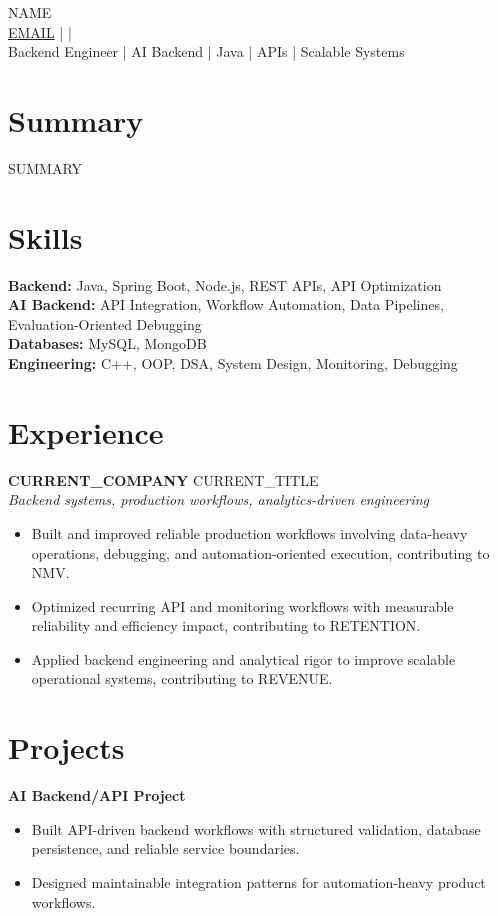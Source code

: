 \documentclass[10pt]{article}
\begin{document}
\begin{center}
{\Large {{NAME}}}\\
\href{mailto:{{EMAIL}}}{{{EMAIL}}} \quad |  \quad | \\
Backend Engineer | AI Backend | Java | APIs | Scalable Systems
\end{center}

\section*{Summary}
{{SUMMARY}}

\section*{Skills}
\textbf{Backend:} Java, Spring Boot, Node.js, REST APIs, API Optimization\\
\textbf{AI Backend:} API Integration, Workflow Automation, Data Pipelines, Evaluation-Oriented Debugging\\
\textbf{Databases:} MySQL, MongoDB\\
\textbf{Engineering:} C++, OOP, DSA, System Design, Monitoring, Debugging

\section*{Experience}
\textbf{{{CURRENT_COMPANY}}} \hfill {{CURRENT_TITLE}}\\
\textit{Backend systems, production workflows, analytics-driven engineering}\\
\begin{itemize}
\item Built and improved reliable production workflows involving data-heavy operations, debugging, and automation-oriented execution, contributing to {{NMV}}.
\item Optimized recurring API and monitoring workflows with measurable reliability and efficiency impact, contributing to {{RETENTION}}.
\item Applied backend engineering and analytical rigor to improve scalable operational systems, contributing to {{REVENUE}}.
\end{itemize}

\section*{Projects}
\textbf{AI Backend/API Project}\\
\begin{itemize}
\item Built API-driven backend workflows with structured validation, database persistence, and reliable service boundaries.
\item Designed maintainable integration patterns for automation-heavy product workflows.
\end{itemize}
\end{document}
